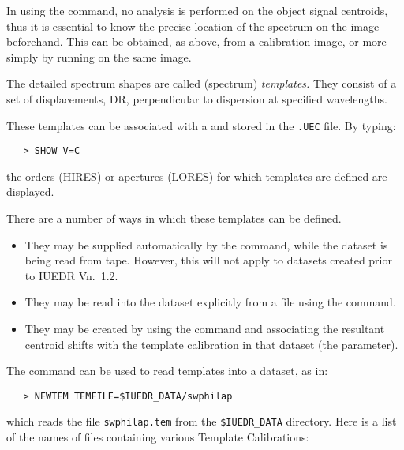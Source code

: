 In using the 
 command, no analysis is performed on the object signal
centroids, thus it is essential to know the precise location of the spectrum on
the image beforehand.  This can be obtained, as above, from a calibration
image, or more simply by running 
 on the same image.

The detailed spectrum shapes are called (spectrum) {\em templates.}  They
consist of a set of displacements, DR, perpendicular to dispersion at
specified wavelengths.

These templates can be associated with a 
 and stored in the
\verb+.UEC+ file.  By typing:

\begin{verbatim}
   > SHOW V=C
\end{verbatim}

the orders (HIRES) or apertures (LORES) for which templates are defined are
displayed.

There are a number of ways in which these templates can be defined.

\begin{itemize}

\item They may be supplied automatically by the
       command, while
      the dataset is being read from tape.  However, this will not apply to
      datasets created prior to IUEDR Vn.~1.2.

\item They may be read into the dataset explicitly from a file using the
       command.

\item They may be created by using the 
      command and associating the
      resultant centroid shifts with the template calibration in that dataset
      (the  parameter)\@.

\end{itemize}

The 
 command can be used to read templates into a dataset, as in:

\begin{verbatim}
   > NEWTEM TEMFILE=$IUEDR_DATA/swphilap
\end{verbatim}

which reads the file \verb+swphilap.tem+ from the \verb+$IUEDR_DATA+  directory.
Here is a list of the names of files containing various Template Calibrations:

